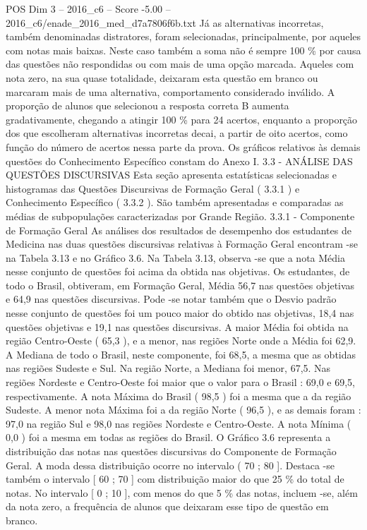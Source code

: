 \begin{textsample}{POS Dim 3 – 2016\_c6 – Score -5.00 – 2016\_c6/enade\_2016\_med\_d7a7806f6b.txt}
Já as alternativas incorretas, também denominadas distratores, foram selecionadas, principalmente, por aqueles com notas mais baixas.
Neste caso também a soma não é sempre 100 \% por causa das questões não respondidas ou com mais de uma opção marcada.
Aqueles com nota zero, na sua quase totalidade, deixaram esta questão em branco ou marcaram mais de uma alternativa, comportamento considerado inválido.
A proporção de alunos que selecionou a resposta correta B aumenta gradativamente, chegando a atingir 100 \% para 24 acertos, enquanto a proporção dos que escolheram alternativas incorretas decai, a partir de oito acertos, como função do número de acertos nessa parte da prova.
Os gráficos relativos às demais questões do Conhecimento Específico constam do Anexo I. 3.3 - ANÁLISE DAS QUESTÕES DISCURSIVAS Esta seção apresenta estatísticas selecionadas e histogramas das Questões Discursivas de Formação Geral ( 3.3.1 ) e Conhecimento Específico ( 3.3.2 ).
São também apresentadas e comparadas as médias de subpopulações caracterizadas por Grande Região. 3.3.1 - Componente de Formação Geral As análises dos resultados de desempenho dos estudantes de Medicina nas duas questões discursivas relativas à Formação Geral encontram -se na Tabela 3.13 e no Gráfico 3.6.
Na Tabela 3.13, observa -se que a nota Média nesse conjunto de questões foi acima da obtida nas objetivas.
Os estudantes, de todo o Brasil, obtiveram, em Formação Geral, Média 56,7 nas questões objetivas e 64,9 nas questões discursivas.
Pode -se notar também que o Desvio padrão nesse conjunto de questões foi um pouco maior do obtido nas objetivas, 18,4 nas questões objetivas e 19,1 nas questões discursivas.
A maior Média foi obtida na região Centro-Oeste ( 65,3 ), e a menor, nas regiões Norte onde a Média foi 62,9.
A Mediana de todo o Brasil, neste componente, foi 68,5, a mesma que as obtidas nas regiões Sudeste e Sul.
Na região Norte, a Mediana foi menor, 67,5.
Nas regiões Nordeste e Centro-Oeste foi maior que o valor para o Brasil : 69,0 e 69,5, respectivamente.
A nota Máxima do Brasil ( 98,5 ) foi a mesma que a da região Sudeste.
A menor nota Máxima foi a da região Norte ( 96,5 ), e as demais foram : 97,0 na região Sul e 98,0 nas regiões Nordeste e Centro-Oeste.
A nota Mínima ( 0,0 ) foi a mesma em todas as regiões do Brasil.
O Gráfico 3.6 representa a distribuição das notas nas questões discursivas do Componente de Formação Geral.
A moda dessa distribuição ocorre no intervalo ( 70 ; 80 ].
Destaca -se também o intervalo [ 60 ; 70 ] com distribuição maior do que 25 \% do total de notas.
No intervalo [ 0 ; 10 ], com menos do que 5 \% das notas, incluem -se, além da nota zero, a frequência de alunos que deixaram esse tipo de questão em branco.

\end{textsample}
